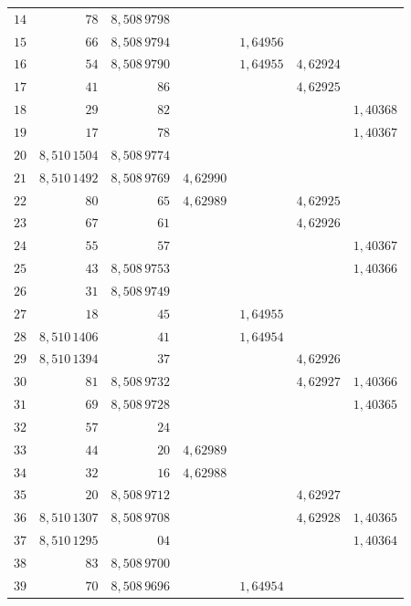 \begin{center}
\begin{tabular}{r||r|r|r|r|r|r}
\(14\) & \(78\) & \(8{,}508\,9798\) &  &  &  &  \\
\(15\) & \(66\) & \(8{,}508\,9794\) &  & \(1{,}64956\) &  &  \\
\hline
\(16\) & \(54\) & \(8{,}508\,9790\) &  & \(1{,}64955\) & \(4{,}62924\) &  \\
\(17\) & \(41\) & \(86\) &  &  & \(4{,}62925\) &  \\
\(18\) & \(29\) & \(82\) &  & \raisebox{.6ex}{.} &  & \(1{,}40368\) \\
\(19\) & \(17\) & \(78\) &  &  &  & \(1{,}40367\) \\
\(20\) & \(8{,}510\,1504\) & \(8{,}508\,9774\) &  &  &  &  \\
\hline
\(21\) & \(8{,}510\,1492\) & \(8{,}508\,9769\) & \(4{,}62990\) &  &  &  \\
\(22\) & \(80\) & \(65\) & \(4{,}62989\) &  & \(4{,}62925\) &  \\
\(23\) & \(67\) & \(61\) &  &  & \(4{,}62926\) &  \\
\(24\) & \(55\) & \(57\) &  &  &  & \(1{,}40367\) \\
\(25\) & \(43\) & \(8{,}508\,9753\) &  &  &  & \(1{,}40366\) \\
\hline
\(26\) & \(31\) & \(8{,}508\,9749\) &  &  &  &  \\
\(27\) & \(18\) & \(45\) &  & \(1{,}64955\) &  &  \\
\(28\) & \(8{,}510\,1406\) & \(41\) &  & \(1{,}64954\) &  &  \\
\(29\) & \(8{,}510\,1394\) & \(37\) &  &  & \(4{,}62926\) &  \\
\(30\) & \(81\) & \(8{,}508\,9732\) &  &  & \(4{,}62927\) & \(1{,}40366\) \\
\hline
\(31\) & \(69\) & \(8{,}508\,9728\) &  &  &  & \(1{,}40365\) \\
\(32\) & \(57\) & \(24\) &  &  &  &  \\
\(33\) & \(44\) & \(20\) & \(4{,}62989\) &  &  &  \\
\(34\) & \(32\) & \(16\) & \(4{,}62988\) &  &  &  \\
\(35\) & \(20\) & \(8{,}508\,9712\) &  &  & \(4{,}62927\) &  \\
\hline
\(36\) & \(8{,}510\,1307\) & \(8{,}508\,9708\) &  &  & \(4{,}62928\) & \(1{,}40365\) \\
\(37\) & \(8{,}510\,1295\) & \(04\) &  &  &  & \(1{,}40364\) \\
\(38\) & \(83\) & \(8{,}508\,9700\) &  &  &  &  \\
\(39\) & \(70\) & \(8{,}508\,9696\) &  & \(1{,}64954\) &  &  \\

\end{tabular}
\end{center}
